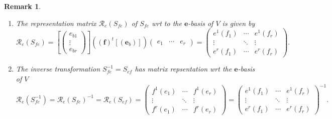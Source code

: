 \documentclass[aps,preprint]{revtex4}
\newtheorem{remark}[theorem]{Remark}
\begin{document}
\begin{remark}
\begin{enumerate}
\item The representation matrix $\mathcal{R}_{e}\left( S_{fe}\right) $ of $%
S_{fe}$ wrt to the $\boldsymbol{e}$-basis of $V$ is given by 
\begin{equation}
\mathcal{R}_{e}\left( S_{fe}\right) =\left[ \left( 
\begin{array}{c}
e_{b1} \\ 
\vdots \\ 
e_{br}%
\end{array}%
\right) \right] \left( \left( \boldsymbol{f}\right) ^{t}\left[ \left( 
\boldsymbol{e}_{b}\right) \right] \right) \left( 
\begin{array}{ccc}
e_{1} & \cdots & e_{r}%
\end{array}%
\right) =\left( 
\begin{array}{ccc}
e^{1}\left( f_{1}\right) & \cdots & e^{1}\left( f_{r}\right) \\ 
\vdots & \ddots & \vdots \\ 
e^{r}\left( f_{1}\right) & \cdots & e^{r}\left( f_{r}\right)%
\end{array}%
\right) .
\end{equation}

\item The inverse transformation $S_{fe}^{-1}=S_{ef}$ has matrix
repsentation wrt the $\boldsymbol{e}$-basis of $V$ 
\begin{equation}
\mathcal{R}_{e}\left( S_{fe}^{-1}\right) =\mathcal{R}_{e}\left(
S_{fe}\right) ^{-1}=\mathcal{R}_{e}\left( S_{ef}\right) =\left( 
\begin{array}{ccc}
f^{1}\left( e_{1}\right) & \cdots & f^{1}\left( e_{r}\right) \\ 
\vdots & \ddots & \vdots \\ 
f^{r}\left( e_{1}\right) & \cdots & f^{r}\left( e_{r}\right)%
\end{array}%
\right) =\left( 
\begin{array}{ccc}
e^{1}\left( f_{1}\right) & \cdots & e^{1}\left( f_{r}\right) \\ 
\vdots & \ddots & \vdots \\ 
e^{r}\left( f_{1}\right) & \cdots & e^{r}\left( f_{r}\right)%
\end{array}%
\right) ^{-1}.
\end{equation}
\end{enumerate}
\end{remark}
\end{document}
